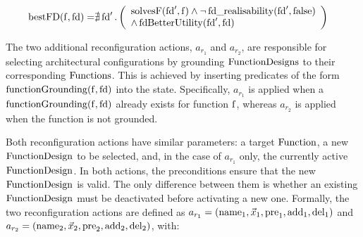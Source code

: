 \begin{align*}
    \operatorname{bestFD}(\operatorname{f}, \operatorname{fd}) =& \nexists \operatorname{fd}'.\left(\begin{array}{l}
         \operatorname{solvesF}(\operatorname{fd}', \operatorname{f})
        \land \neg \operatorname{fd\_realisability}(\operatorname{fd}', \operatorname{false}) \\
        \land \operatorname{fdBetterUtility}(\operatorname{fd}', \operatorname{fd})
    \end{array} \right)
\end{align*}

The two additional reconfiguration actions, $a_{r_1}$ and $a_{r_2}$, are responsible for selecting architectural configurations by grounding $\operatorname{FunctionDesigns}$ to their corresponding $\operatorname{Functions}$. This is achieved by inserting predicates of the form $\operatorname{functionGrounding}(\operatorname{f}, \operatorname{fd})$ into the state. Specifically, $a_{r_1}$ is applied when a $\operatorname{functionGrounding}(\operatorname{f}, \operatorname{fd})$ already exists for function $\operatorname{f}$, whereas $a_{r_2}$ is applied when the function is not grounded.

Both reconfiguration actions have similar parameters: a target $\operatorname{Function}$, a new $\operatorname{FunctionDesign}$ to be selected, and, in the case of $a_{r_1}$ only, the currently active $\operatorname{FunctionDesign}$. In both actions, the preconditions ensure that the new $\operatorname{FunctionDesign}$ is valid. The only difference between them is whether an existing $\operatorname{FunctionDesign}$ must be deactivated before activating a new one. Formally, the two reconfiguration actions are defined as $a_{r_1} = (\operatorname{name}_1, \vec{x}_1, \operatorname{pre}_1, \operatorname{add}_1, \operatorname{del}_1)$ and $a_{r_2} = (\operatorname{name}_2, \vec{x}_2, \operatorname{pre}_2, \operatorname{add}_2, \operatorname{del}_2)$, with:

